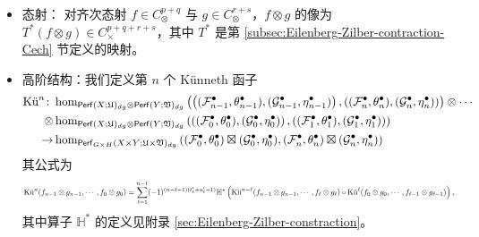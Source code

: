 \begin{defn}
\begin{itemize}
\item
态射：
对齐次态射 $f\in C_{\otimes}^{p+q}$ 与 $g\in C_{\otimes}^{r+s}$，$f\otimes g$ 的像为 $T^{\ast}(f\otimes g)\in C_{\times}^{p+q+r+s}$，其中 $T^{\ast}$ 是第 \ref{subsec:Eilenberg-Zilber-contraction-Cech} 节定义的映射。
\item
高阶结构：我们定义第 $n$ 个 Künneth 函子
\begin{align*}
\Ku^n\colon &\hom_{\Perf (X;\mathfrak{U})_{dg}\otimes\Perf(Y;\mathfrak{V})_{dg}}\left(\left(
    (\mathcal{F}_{n-1}^{\bullet},\theta_{n-1}^{\bullet}),(\mathcal{G}_{n-1}^{\bullet},\eta_{n-1}^{\bullet})\right),
    \left((\mathcal{F}_n^{\bullet},\theta_n^{\bullet}),(\mathcal{G}_{n}^{\bullet},\eta_n^{\bullet})\right)\right)
    \otimes\dotsb\\ 
    \otimes
    &\hom_{\Perf (X;\mathfrak{U})_{dg}\otimes\Perf(Y;\mathfrak{V})_{dg}}\left(\left(
    (\mathcal{F}_0^{\bullet},\theta_0^{\bullet}),(\mathcal{G}_0^{\bullet},\eta_0^{\bullet})\right),
    \left((\mathcal{F}_1^{\bullet},\theta_1^{\bullet}),(\mathcal{G}_1^{\bullet},\eta_1^{\bullet})\right)\right)\\
    \to &\hom_{\Perf_{G\times H} (X\times Y;\mathfrak{U}\times\mathfrak{V})_{dg}}
    \left((\mathcal{F}_0^{\bullet},\theta_0^{\bullet})\boxtimes (\mathcal{G}_0^{\bullet},\eta_0^{\bullet}),(\mathcal{F}_n^{\bullet},\theta_n^{\bullet})\boxtimes (\mathcal{G}_n^{\bullet},\eta_n^{\bullet})\right)
\end{align*}
其公式为
\[
\resizebox{\linewidth}{!}{$\displaystyle
    \Ku^n (f_{n-1}\otimes g_{n-1},\dotsb, f_0\otimes g_0)=\sum_{\ell=1}^{n-1} (-1)^{(n-\ell -1)(t_{\ell}'+u_{\ell}'-1)}\mathbb{H}^{\ast}\left(
        \Ku^{n-\ell} (f_{n-1}\otimes g_{n-1},\dotsb, f_{\ell}\otimes g_{\ell})\circ\Ku^{\ell} (f_0\otimes g_0,\dotsb, f_{\ell-1}\otimes g_{\ell-1})
        \right),$}
\]
其中算子 $\mathbb{H}^{\ast}$ 的定义见附录 \ref{sec:Eilenberg-Zilber-constraction}。
\end{itemize}
\end{defn}

